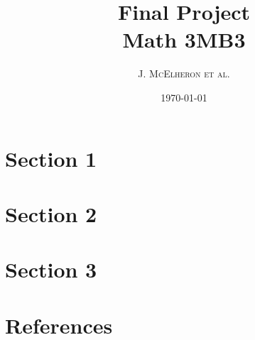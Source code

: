 \documentclass{article}
\title {Final Project \\  Math 3MB3 } %
\author{ J. \textsc{McElheron et al.}} %
\date{\today} %
\begin{document}
\begin{titlepage}
\maketitle %
\thispagestyle{empty}
\end{titlepage}

\section{Section 1}
\section{Section 2}

\section{Section 3}

\newpage
\section{References}
\end{document}
